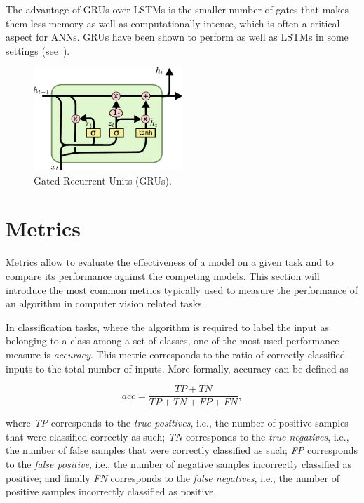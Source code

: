 The advantage of GRUs over LSTMs is the smaller number of gates that makes them
less memory as well as computationally intense, which is often a critical
aspect for ANNs. GRUs have been shown to perform as well as LSTMs in some
settings (see~\citep{Chung-et-al-NIPSDL2014-small}).

\begin{figure}[pt]
    \centering
    \includegraphics[width=0.5\textwidth]{pdf/GRU.pdf}
    \caption{Gated Recurrent Units (GRUs).\label{fig:GRU}}
\end{figure}

\section{Metrics}
Metrics allow to evaluate the effectiveness of a model on a given task and to
compare its performance against the competing models. This section will
introduce the most common metrics typically used to measure the performance of
an algorithm in computer vision related tasks.

In classification tasks, where the algorithm is required to label the input as
belonging to a class among a set of classes, one of the most used performance
measure is \emph{accuracy}. This metric corresponds to the ratio of correctly
classified inputs to the total number of inputs. More formally, accuracy can be
defined as

\begin{equation}\label{eq:accuracy}
    acc = \frac{TP + TN}{TP + TN + FP + FN},
\end{equation}

\noindent where \emph{TP} corresponds to the \emph{true positives}, i.e., the
number of positive samples that were classified correctly as such; \emph{TN}
corresponds to the \emph{true negatives}, i.e., the number of false samples
that were correctly classified as such; \emph{FP} corresponds to the
\emph{false positive}, i.e., the number of negative samples incorrectly
classified as positive; and finally \emph{FN} corresponds to the \emph{false
negatives}, i.e., the number of positive samples incorrectly classified as
positive.

